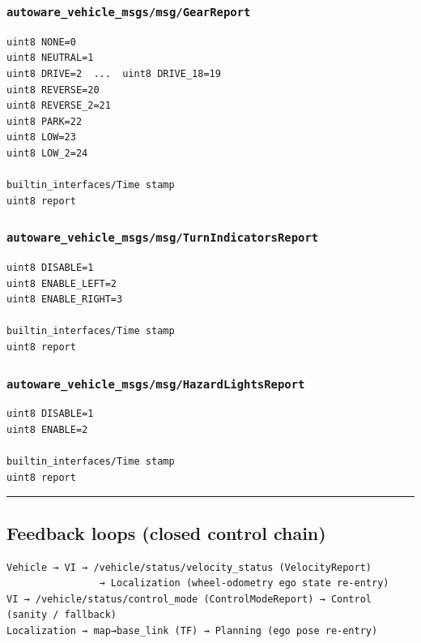 \documentclass[
]{article}
\begin{document}
\subsubsection{\texorpdfstring{\texttt{autoware\_vehicle\_msgs/msg/GearReport}}{autoware\_vehicle\_msgs/msg/GearReport}}\label{autoware_vehicle_msgsmsggearreport}

\begin{verbatim}
uint8 NONE=0
uint8 NEUTRAL=1
uint8 DRIVE=2  ...  uint8 DRIVE_18=19
uint8 REVERSE=20
uint8 REVERSE_2=21
uint8 PARK=22
uint8 LOW=23
uint8 LOW_2=24

builtin_interfaces/Time stamp
uint8 report
\end{verbatim}

\subsubsection{\texorpdfstring{\texttt{autoware\_vehicle\_msgs/msg/TurnIndicatorsReport}}{autoware\_vehicle\_msgs/msg/TurnIndicatorsReport}}\label{autoware_vehicle_msgsmsgturnindicatorsreport}

\begin{verbatim}
uint8 DISABLE=1
uint8 ENABLE_LEFT=2
uint8 ENABLE_RIGHT=3

builtin_interfaces/Time stamp
uint8 report
\end{verbatim}

\subsubsection{\texorpdfstring{\texttt{autoware\_vehicle\_msgs/msg/HazardLightsReport}}{autoware\_vehicle\_msgs/msg/HazardLightsReport}}\label{autoware_vehicle_msgsmsghazardlightsreport}

\begin{verbatim}
uint8 DISABLE=1
uint8 ENABLE=2

builtin_interfaces/Time stamp
uint8 report
\end{verbatim}

\begin{center}\rule{0.5\linewidth}{0.5pt}\end{center}

\subsection{Feedback loops (closed control
chain)}\label{feedback-loops-closed-control-chain}

\begin{verbatim}
Vehicle → VI → /vehicle/status/velocity_status (VelocityReport)
                → Localization (wheel-odometry ego state re-entry)
VI → /vehicle/status/control_mode (ControlModeReport) → Control (sanity / fallback)
Localization → map→base_link (TF) → Planning (ego pose re-entry)
\end{verbatim}
\end{document}
